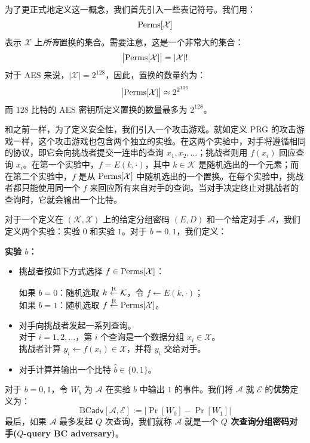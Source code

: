 为了更正式地定义这一概念，我们首先引入一些表记符号。我们用：
\[
{\rm Perms}[\mathcal{X}]
\]
表示 $\mathcal{X}$ 上\emph{所有}置换的集合。需要注意，这是一个非常大的集合：
\[
\big\lvert
{\rm Perms}[\mathcal{X}]
\big\rvert
=|\mathcal{X}|!
\]
对于 AES 来说，$|\mathcal{X}|=2^{128}$，因此，置换的数量约为：
\[
\big\lvert
{\rm Perms}[\mathcal{X}]
\big\rvert
\approx 2^{2^{135}}
\]
而 $128$ 比特的 AES 密钥所定义置换的数量最多为 $2^{128}$。

和之前一样，为了定义安全性，我们引入一个攻击游戏。就如定义 PRG 的攻击游戏一样，这个攻击游戏也包含两个独立的实验。在这两个实验中，对手将遵循相同的协议，即它会向挑战者提交一连串的查询 $x_1,x_2,\dots$；挑战者则用 $f(x_i)$ 回应查询 $x_i$。在第一个实验中，$f=E(k,\cdot)$，其中 $k\in\mathcal{K}$ 是随机选出的一个元素；而在第二个实验中，$f$ 是从 ${\rm Perms}[\mathcal{X}]$ 中随机选出的一个置换。在每个实验中，挑战者都只能使用同一个 $f$ 来回应所有来自对手的查询。当对手决定终止对挑战者的查询时，它就会输出一个比特。

\begin{game}[分组密码]\label{game:4-1}
对于一个定义在 $(\mathcal{K},\mathcal{X})$ 上的给定分组密码 $(E,D)$ 和一个给定对手 $\mathcal{A}$，我们定义两个实验：实验 $0$ 和实验 $1$。对于 $b=0,1$，我们定义：

\noindent\textbf{实验 $b$：}
\begin{itemize}
	\item 挑战者按如下方式选择 $f\in{\rm Perms}[\mathcal{X}]$：
	
	\hspace*{26pt} 如果 $b=0$：随机选取 $k\overset{\rm R}\leftarrow\mathcal{K}$，令 $f\leftarrow E(k,\cdot)$；\\
	\hspace*{26pt} 如果 $b=1$：随机选取 $f\overset{\rm R}\leftarrow{\rm Perms}[\mathcal{X}]$。
	
	\item 对手向挑战者发起一系列查询。\\
	对于 $i=1,2,\dots$，第 $i$ 个查询是一个数据分组 $x_i\in\mathcal{X}$。\\
	挑战者计算 $y_i\leftarrow f(x_i)\in\mathcal{X}$，并将 $y_i$ 交给对手。
	\item 对手计算并输出一个比特 $\hat b\in\{0,1\}$。
\end{itemize}

对于 $b=0,1$，令 $W_b$ 为 $\mathcal{A}$ 在实验 $b$ 中输出 $1$ 的事件。我们将 $\mathcal{A}$ 就 $\mathcal{E}$ 的\textbf{优势}定义为：
\[
\mathrm{BC}\mathsf{adv}[\mathcal{A},\mathcal{E}]
:=
\big\lvert
\Pr[W_0]-\Pr[W_1]
\big\rvert
\]
最后，如果 $\mathcal{A}$ 最多发起 $Q$ 次查询，我们就称 $\mathcal{A}$ 就是一个 \textbf{$Q$ 次查询分组密码对手($Q$-query BC adversary)}。
\end{game}

